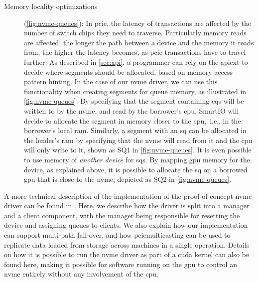 \begin{description}
    \item[Memory locality optimizations] (\cref{fig:nvme-queues}):
        In \gls{pcie}, the latency of transactions are affected by the number of switch chips they need to traverse.
        Particularly memory reads are affected; the longer the path between a device and the memory it reads from, the higher the latency becomes, as \gls{pcie} transactions have to travel further.
        As described in \cref{sec:api}, a programmer can rely on the \gls{apiext} to decide where \glspl{segment} should be allocated, based on memory access pattern hinting.
        In the case of our \gls{nvme} driver, we can use this functionality when creating \glspl{segment} for queue memory, as illustrated in \cref{fig:nvme-queues}.
        By specifying that the \gls{segment} containing \glspl{cq} will be written to by the \gls{nvme}, and read by the \gls{borrower}'s \gls{cpu}, SmartIO will decide to allocate the \gls{segment} in memory closer to the \gls{cpu},~i.e., in the \gls{borrower}'s local \gls{ram}.
        Similarly, a segment with an \gls{sq} can be allocated in the \gls{lender}'s \gls{ram} by specifying that the \gls{nvme} will read from it and the \gls{cpu} will only write to it, shown as SQ1 in \cref{fig:nvme-queues}.
        It is even possible to use memory of \emph{another device} for \glspl{sq}.
        By mapping \gls{gpu} memory for the device, as explained above, it is possible to allocate the \gls{sq} on a borrowed \gls{gpu} that is close to the \gls{nvme}, depicted as SQ2 in \cref{fig:nvme-queues}.

\end{description}


A more technical description of the implementation of the proof-of-concept \gls{nvme} driver can be found in .
%
Here, we describe how the driver is split into a manager and a client component, with the manager being responsible for resetting the device and assigning queues to clients.
%
We also explain how our implementation can support multi-path fail-over, and how \gls{pciemulticasting} can be used to replicate data loaded from storage across machines in a single operation.
%
Details on how it is possible to run the \gls{nvme} driver as part of a \gls{cuda} kernel can also be found here, making it possible for software running on the \gls{gpu} to control an \gls{nvme} entirely without any involvement of the \gls{cpu}.



